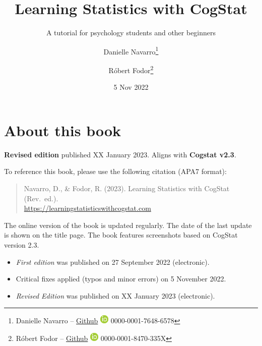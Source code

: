 \documentclass[
  11pt,
]{book}
\title{Learning Statistics with CogStat}
\subtitle{A tutorial for psychology students and other beginners}
\author{Danielle Navarro\footnote{Danielle Navarro -- \href{https://github.com/djnavarro/}{Github} \textbar{} \href{https://orcid.org/0000-0001-7648-6578}{\includegraphics{resources/image/orcid_16x16.png}} 0000-0001-7648-6578} \and Róbert Fodor\footnote{Róbert Fodor -- \href{https://github.com/robertfodor/}{Github} \textbar{} \href{https://orcid.org/0000-0001-8470-335X}{\includegraphics{resources/image/orcid_16x16.png}} 0000-0001-8470-335X}}
\date{5 Nov 2022}
\providecommand{\tightlist}{%
  \setlength{\itemsep}{0pt}\setlength{\parskip}{0pt}}
\theoremstyle{indenteddefinition}
\theoremstyle{indenteddefinition}
\theoremstyle{definition}
\theoremstyle{definition}
\theoremstyle{remark}
\let\oldmaketitle\maketitle
\begin{document}
\maketitle

\frontmatter
{} %

\newpage
\let\maketitle\oldmaketitle
\maketitle
{} %
\setcounter{page}{1}

\mainmatter
{}

{
\hypersetup{linkcolor=black}
\setcounter{tocdepth}{1}
\tableofcontents
}
\hypertarget{about-this-book}{%
\chapter*{About this book}\label{about-this-book}}

\textbf{Revised edition} published XX January 2023. Aligns with \textbf{Cogstat v2.3}.

To reference this book, please use the following citation (APA7 format):

\begin{quote}
Navarro, D., \& Fodor, R. (2023). Learning Statistics with CogStat (Rev.~ed.).\\
\url{https://learningstatisticswithcogstat.com}
\end{quote}

The online version of the book is updated regularly. The date of the last update is shown on the title page. The book features screenshots based on CogStat version 2.3.

\begin{itemize}
\tightlist
\item
  \emph{First edition} was published on 27 September 2022 (electronic).
\item
  Critical fixes applied (typos and minor errors) on 5 November 2022.
\item
  \emph{Revised Edition} was published on XX January 2023 (electronic).
\end{itemize}
\end{document}
